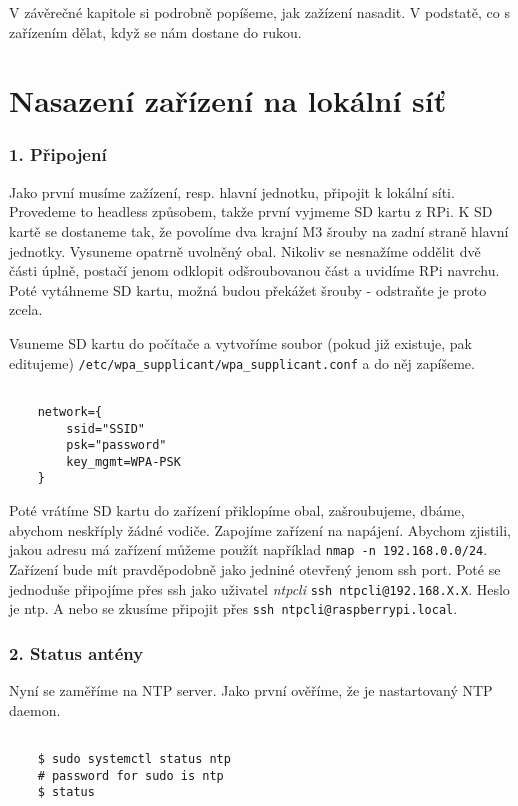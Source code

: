 V závěrečné kapitole si podrobně popíšeme, jak zažízení nasadit. V podstatě, co s
zařízením dělat, když se nám dostane do rukou.

\section{Nasazení zařízení na lokální síť}
\subsubsection{1. Připojení}
    Jako první musíme zažízení, resp. hlavní jednotku, připojit k lokální síti. Provedeme
    to headless způsobem, takže první vyjmeme SD kartu z RPi. K SD kartě se dostaneme tak,
    že povolíme dva krajní M3 šrouby na zadní straně hlavní jednotky. Vysuneme opatrně
    uvolněný obal. Nikoliv se nesnažíme oddělit dvě části úplně, postačí jenom odklopit
    odšroubovanou část a uvidíme RPi navrchu. Poté vytáhneme SD kartu, možná budou
    překážet šrouby - odstraňte je proto zcela.

    Vsuneme SD kartu do počítače a vytvoříme soubor (pokud již existuje, pak editujeme)
    \verb|/etc/wpa_supplicant/wpa_supplicant.conf| a do něj zapíšeme.

    \begin{lstlisting}

    network={
        ssid="SSID"
        psk="password"
        key_mgmt=WPA-PSK
    }

    \end{lstlisting}

    Poté vrátíme SD kartu do zařízení přiklopíme obal, zašroubujeme, dbáme, abychom
    neskříply žádné vodiče. Zapojíme zařízení na napájení. Abychom zjistili, jakou adresu
    má zařízení můžeme použít například \verb|nmap -n 192.168.0.0/24|. Zařízení bude mít
    pravděpodobně jako jedniné otevřený jenom ssh port. Poté se jednoduše připojíme přes
    ssh jako uživatel \textit{ntpcli} \verb|ssh ntpcli@192.168.X.X|. Heslo je ntp. A nebo se zkusíme
    připojit přes \verb|ssh ntpcli@raspberrypi.local|.

\newpage

\subsubsection{2. Status antény}

    Nyní se zaměříme na NTP server. Jako první ověříme, že je nastartovaný NTP daemon.

    \begin{lstlisting}

    $ sudo systemctl status ntp
    # password for sudo is ntp
    $ status

    \end{lstlisting}

